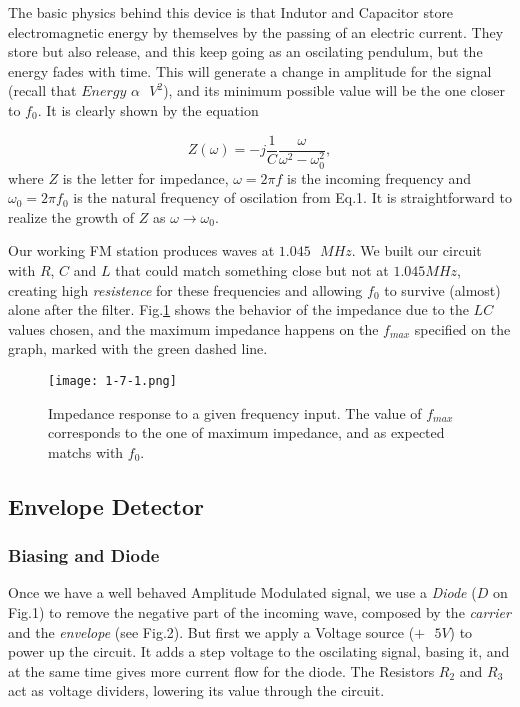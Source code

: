 \documentclass{article}
\begin{document}
The basic
physics behind this device is that Indutor and Capacitor store
electromagnetic energy by themselves by the passing of an electric
current. They store but also release, and this keep going as an
oscilating pendulum, but the energy fades with time. This will
generate a change in amplitude for the signal (recall that $Energy \text{
  }\alpha \text{ }V^{2}$), and its minimum possible value will be
the one closer to $f_{0}$. It is clearly shown by the equation

\begin{equation}
Z(\omega) = -j\frac{1}{C}\frac{\omega}{\omega^{2} - \omega^{2}_{0}},
\label{eq:1}
\end{equation}
where $Z$ is the letter for impedance, $\omega=2 \pi f$ is the incoming frequency and $\omega_{0}=2 \pi f_{0}$ is the natural frequency of oscilation from Eq.1. It is straightforward to realize the growth of $Z$ as $\omega \rightarrow \omega_{0}$.

Our working FM station produces waves at
$1.045 \text{ }MHz$. We built our circuit with $R$, $C$ and
$L$ that could match something close but not at $1.045 \text{
}MHz$, creating high \emph{resistence} for these frequencies and
allowing $f_{0}$ to survive (almost) alone after the filter. Fig.\ref{LC} shows the
behavior of the impedance due to the $LC$ values chosen, and
the maximum impedance happens on the $f_{max}$ specified on the graph,
marked with the green dashed line. 

\begin{figure}[H]
\center
\texttt{[image: 1-7-1.png]}
\caption {Impedance response to a given frequency input. The value of $f_{max}$ corresponds to the one of maximum impedance, and as expected matchs with $f_{0}$.} 
\label{LC}
\end{figure}

\subsection{Envelope Detector}

\subsubsection{Biasing and Diode}

Once we have a well behaved Amplitude Modulated signal, we use a \emph{Diode} ($D$ on Fig.1) to remove the negative part of the incoming wave, composed by the \emph{carrier} and the \emph{envelope} (see Fig.2). But first we apply a Voltage source ($+ \text{ }5V$) to power up the circuit. It adds a step voltage to the oscilating signal, basing it, and at the same time gives more current flow for the diode. The Resistors $R_{2}$ and $R_{3}$ act as voltage dividers, lowering its value through the circuit. 
\end{document}

